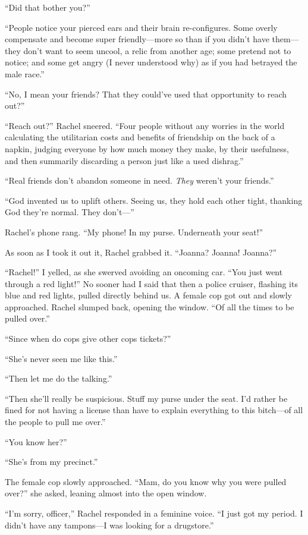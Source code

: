 ``Did that bother you?''

``People notice your pierced ears and their brain re-configures. Some
overly compensate and become super friendly---more so than if you didn't
have them---they don't want to seem uncool, a relic from another age;
some pretend not to notice; and some get angry (I never understood why)
as if you had betrayed the male race.''

``No, I mean your friends? That they could've used that opportunity to
reach out?''

``Reach out?'' Rachel sneered. ``Four people without any worries in the
world calculating the utilitarian costs and benefits of friendship on
the back of a napkin, judging everyone by how much money they make, by
their usefulness, and then summarily discarding a person just like a
used dishrag.''

``Real friends don't abandon someone in need. \emph{They} weren't your
friends.''

``God invented us to uplift others. Seeing us, they hold each other
tight, thanking God they're normal. They don't---''

Rachel's phone rang. ``My phone! In my purse. Underneath your seat!''

As soon as I took it out it, Rachel grabbed it. ``Joanna? Joanna!
Joanna?''

``Rachel!'' I yelled, as she swerved avoiding an oncoming car. ``You
just went through a red light!'' No sooner had I said that then a police
cruiser, flashing its blue and red lights, pulled directly behind us. A
female cop got out and slowly approached. Rachel slumped back, opening
the window. ``Of all the times to be pulled over.''

``Since when do cops give other cops tickets?''

``She's never seen me like this.''

``Then let me do the talking.''

``Then she'll really be suspicious. Stuff my purse under the seat. I'd
rather be fined for not having a license than have to explain everything
to this bitch---of all the people to pull me over.''

``You know her?''

``She's from my precinct.''

The female cop slowly approached. ``Mam, do you know why you were pulled
over?'' she asked, leaning almost into the open window.

``I'm sorry, officer,'' Rachel responded in a feminine voice. ``I just
got my period. I didn't have any tampons---I was looking for a
drugstore.''

